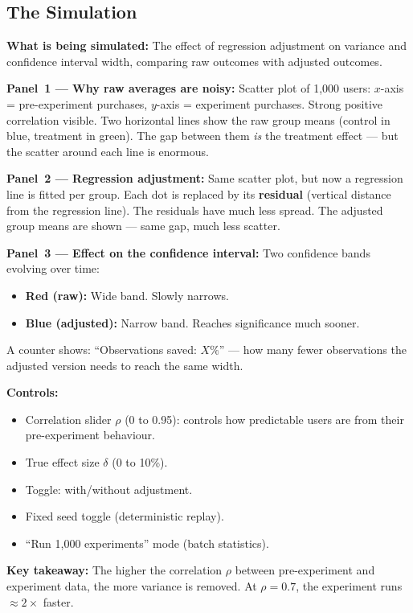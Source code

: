 \documentclass[12pt, a4paper]{article}
\begin{document}
\subsection{The Simulation}

\begin{simulation}
\textbf{What is being simulated:}
The effect of regression adjustment on variance and confidence interval width,
comparing raw outcomes with adjusted outcomes.

\textbf{Panel~1 --- Why raw averages are noisy:}
Scatter plot of 1,000 users: $x$-axis = pre-experiment purchases,
$y$-axis = experiment purchases.  Strong positive correlation visible.
Two horizontal lines show the raw group means (control in blue, treatment
in green).  The gap between them \emph{is} the treatment effect --- but the
scatter around each line is enormous.

\textbf{Panel~2 --- Regression adjustment:}
Same scatter plot, but now a regression line is fitted per group.  Each dot
is replaced by its \textbf{residual} (vertical distance from the regression
line).  The residuals have much less spread.  The adjusted group means are
shown --- same gap, much less scatter.

\textbf{Panel~3 --- Effect on the confidence interval:}
Two confidence bands evolving over time:
\begin{itemize}[nosep]
  \item \textbf{Red (raw):} Wide band.  Slowly narrows.
  \item \textbf{Blue (adjusted):} Narrow band.  Reaches significance much
        sooner.
\end{itemize}
A counter shows: ``Observations saved: $X\%$'' --- how many fewer
observations the adjusted version needs to reach the same width.

\textbf{Controls:}
\begin{itemize}[nosep]
  \item Correlation slider $\rho$ (0 to 0.95): controls how predictable
        users are from their pre-experiment behaviour.
  \item True effect size $\delta$ (0 to 10\%).
  \item Toggle: with/without adjustment.
  \item Fixed seed toggle (deterministic replay).
  \item ``Run 1,000 experiments'' mode (batch statistics).
\end{itemize}

\textbf{Key takeaway:}
The higher the correlation $\rho$ between pre-experiment and experiment data,
the more variance is removed.  At $\rho = 0.7$, the experiment runs
$\approx 2\times$ faster.
\end{simulation}
\end{document}
